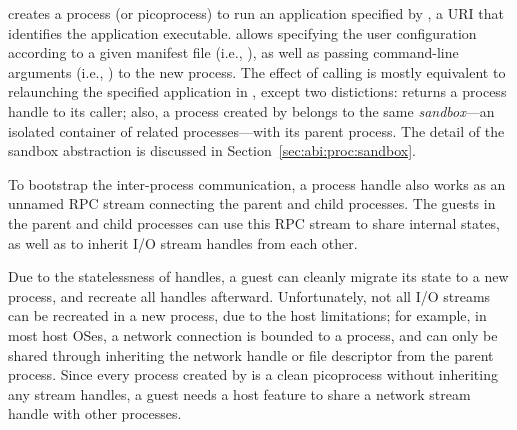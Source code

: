  creates a process (or picoprocess) to run an application specified by
, a URI that identifies the application executable.
 allows specifying the user configuration
according to a given manifest file (i.e., ), as well as passing command-line arguments (i.e., ) to the new process.
The effect of calling  is mostly equivalent to
relaunching the specified application in \graphene{},
except two distictions:  returns a process handle to its caller;
also, a process created by  belongs to the same {\em sandbox}---an isolated container of related processes---with its parent process.
The detail of the sandbox abstraction is discussed in Section~\ref{sec:abi:proc:sandbox}.






To bootstrap the inter-process communication, a process handle also works as an unnamed RPC stream connecting the parent and child processes.
The guests in the parent and child processes can use this RPC stream to share internal states,
as well as to inherit I/O stream handles from each other.











Due to the statelessness of handles,
a guest can cleanly migrate its state to a new process, and recreate all handles afterward.
Unfortunately, not all I/O streams can be recreated
in a new process, due to the host limitations;
for example, in most host OSes, a network connection is bounded to a process,
and can only be shared through inheriting the network handle or file descriptor from the parent process.
Since every process created by  is a clean picoprocess without inheriting any stream handles,
a guest needs a host feature
to share a network stream handle with other processes.


